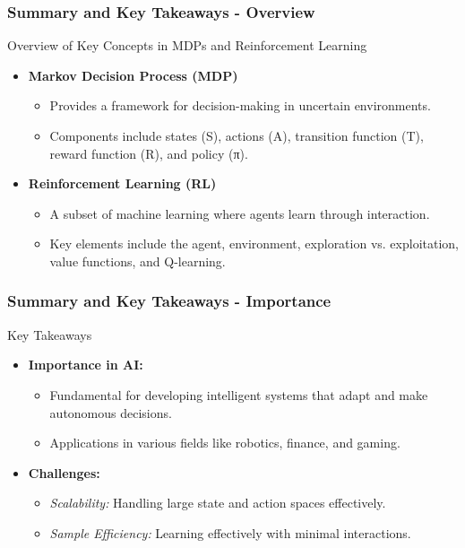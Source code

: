 \documentclass[aspectratio=169]{beamer}
\begin{document}
\begin{frame}[fragile]
  \frametitle{Summary and Key Takeaways - Overview}
  \begin{block}{Overview of Key Concepts in MDPs and Reinforcement Learning}
    \begin{itemize}
      \item \textbf{Markov Decision Process (MDP)}
      \begin{itemize}
        \item Provides a framework for decision-making in uncertain environments.
        \item Components include states (S), actions (A), transition function (T), reward function (R), and policy (π).
      \end{itemize}
      \item \textbf{Reinforcement Learning (RL)}
      \begin{itemize}
        \item A subset of machine learning where agents learn through interaction.
        \item Key elements include the agent, environment, exploration vs. exploitation, value functions, and Q-learning.
      \end{itemize}
    \end{itemize}
  \end{block}
\end{frame}

\begin{frame}[fragile]
  \frametitle{Summary and Key Takeaways - Importance}
  \begin{block}{Key Takeaways}
    \begin{itemize}
      \item \textbf{Importance in AI:}
      \begin{itemize}
        \item Fundamental for developing intelligent systems that adapt and make autonomous decisions.
        \item Applications in various fields like robotics, finance, and gaming.
      \end{itemize}
      \item \textbf{Challenges:}
      \begin{itemize}
        \item \textit{Scalability:} Handling large state and action spaces effectively.
        \item \textit{Sample Efficiency:} Learning effectively with minimal interactions.
      \end{itemize}
    \end{itemize}
  \end{block}
\end{frame}
\end{document}
